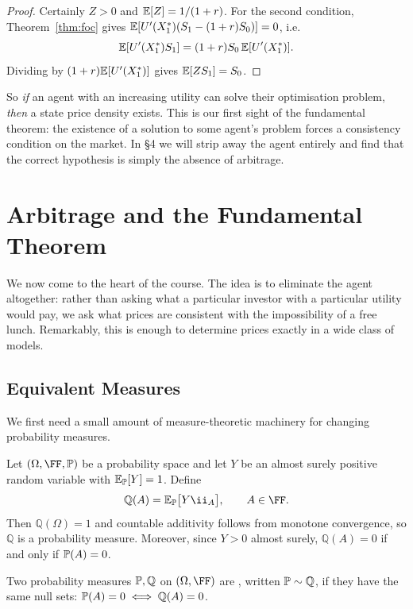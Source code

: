 \documentclass[a4paper]{scrartcl}
\newcommand{\QQ}{\mathbb{Q}}
\begin{document}
\begin{proof}
	Certainly $Z > 0$ and $\mathbb{E}[Z] = 1/(1+r)$. For the second condition, Theorem~\ref{thm:foc} gives $\mathbb{E}[U'(X_1^*)(S_1 - (1+r)S_0)] = 0$, i.e.
	$$
	\mathbb{E}[U'(X_1^*)S_1] = (1+r)S_0\,\mathbb{E}[U'(X_1^*)].
	$$
	Dividing by $(1+r)\mathbb{E}[U'(X_1^*)]$ gives $\mathbb{E}[ZS_1] = S_0$.
\end{proof}

So \emph{if} an agent with an increasing utility can solve their optimisation problem, \emph{then} a state price density exists. This is our first sight of the fundamental theorem: the existence of a solution to some agent's problem forces a consistency condition on the market. In \S4 we will strip away the agent entirely and find that the correct hypothesis is simply the absence of arbitrage.

\section{Arbitrage and the Fundamental Theorem}

We now come to the heart of the course. The idea is to eliminate the agent altogether: rather than asking what a particular investor with a particular utility would pay, we ask what prices are consistent with the impossibility of a free lunch. Remarkably, this is enough to determine prices exactly in a wide class of models.

\subsection{Equivalent Measures}

We first need a small amount of measure-theoretic machinery for changing probability measures.

Let $(\Omega, \FF, \PP)$ be a probability space and let $Y$ be an almost surely positive random variable with $\mathbb{E}_{\mathbb{P}}[Y] = 1$. Define
$$
\QQ(A) = \EE_\PP\big[Y \ii_A\big], \qquad A \in \FF.
$$
Then $\QQ(\Omega) = 1$ and countable additivity follows from monotone convergence, so $\QQ$ is a probability measure. Moreover, since $Y > 0$ almost surely, $\QQ(A) = 0$ if and only if $\mathbb{P}(A) = 0$.

\begin{definition}
	Two probability measures $\PP, \QQ$ on $(\Omega, \FF)$ are , written $\PP \sim \QQ$, if they have the same null sets: $\PP(A) = 0 \iff \QQ(A) = 0$.
\end{definition}
\end{document}
